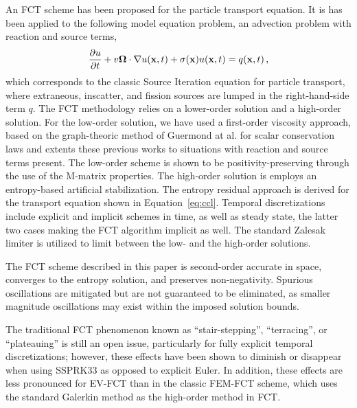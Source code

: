 An FCT scheme has been proposed for the particle transport equation. It is has been applied
to the following model equation problem, an advection problem with reaction and source terms,
\begin{equation} \label{eq:ccl}
  \frac{\partial u}{\partial t} + v\mathbf{\Omega}\cdot\nabla u(\mathbf{x},t) + \sigma(\mathbf{x}) u(\mathbf{x},t) = q(\mathbf{x},t) \,,
\end{equation}
which corresponds to the classic Source Iteration equation for particle transport,
where extraneous, inscatter, and fission sources are lumped in the right-hand-side term $q$.
%
The FCT methodology relies on a lower-order solution and a high-order solution. For the low-order
solution, we have used a first-order viscosity approach, based on the graph-theoric method of 
Guermond at al. \cite{guermond_first_order} for scalar conservation laws and extents these
previous works to situations with reaction and source terms present. The low-order scheme is shown
to be positivity-preserving through the use of the M-matrix properties. The high-order solution
is employs an entropy-based artificial stabilization. The entropy residual approach is derived
for the transport equation shown in Equation~\eqref{eq:ccl}. 
Temporal discretizations include explicit and implicit schemes in time, as well as steady state,
the latter two cases making the FCT algorithm implicit as well. The standard Zalesak limiter is utilized
to limit between the low- and the high-order solutions.

The FCT scheme described in this paper is second-order accurate in space,
converges to the entropy solution, and preserves non-negativity.
Spurious oscillations are mitigated but are not guaranteed to be
eliminated, as smaller magnitude oscillations may exist within the imposed
solution bounds.


The traditional FCT phenomenon known as ``stair-stepping'',
``terracing'', or ``plateauing'' is still an open issue, particularly for
fully explicit temporal discretizations; however, these effects
have been shown to diminish or disappear when using SSPRK33 as opposed
to explicit Euler. In addition, these effects are less pronounced for EV-FCT
than in the classic FEM-FCT scheme, which uses the standard Galerkin method as
the high-order method in FCT.

